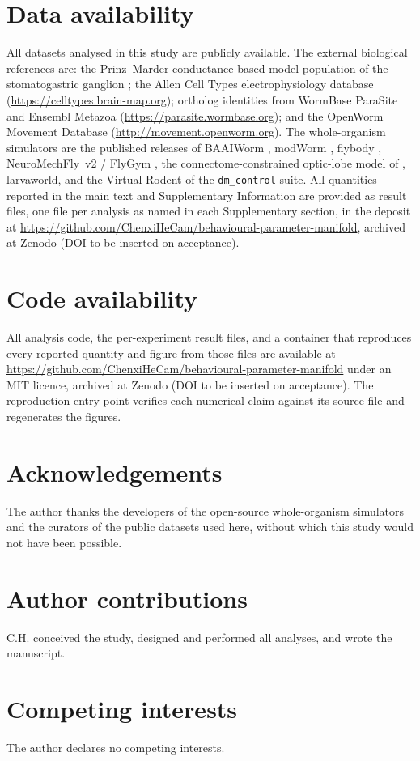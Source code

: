 \documentclass[11pt]{article}
\begin{document}
\section*{Data availability}
All datasets analysed in this study are publicly available. The external biological references are: the Prinz--Marder conductance-based model population of the stomatogastric ganglion \citep{prinz2004similar}; the Allen Cell Types electrophysiology database (\url{https://celltypes.brain-map.org}); ortholog identities from WormBase ParaSite and Ensembl Metazoa (\url{https://parasite.wormbase.org}); and the OpenWorm Movement Database (\url{http://movement.openworm.org}). The whole-organism simulators are the published releases of BAAIWorm \citep{wang2025baaiworm}, modWorm \citep{shlizerman2025modworm}, flybody \citep{vaxenburg2025flybody}, NeuroMechFly~v2 / FlyGym \citep{wangchen2024neuromechfly}, the connectome-constrained optic-lobe model of \citet{lappalainen2024connectome}, larvaworld, and the Virtual Rodent of the \texttt{dm\_control} suite. All quantities reported in the main text and Supplementary Information are provided as result files, one file per analysis as named in each Supplementary section, in the deposit at \url{https://github.com/ChenxiHeCam/behavioural-parameter-manifold}, archived at Zenodo (DOI to be inserted on acceptance).

\section*{Code availability}
All analysis code, the per-experiment result files, and a container that reproduces every reported quantity and figure from those files are available at \url{https://github.com/ChenxiHeCam/behavioural-parameter-manifold} under an MIT licence, archived at Zenodo (DOI to be inserted on acceptance). The reproduction entry point verifies each numerical claim against its source file and regenerates the figures.

\section*{Acknowledgements}
The author thanks the developers of the open-source whole-organism simulators and the curators of the public datasets used here, without which this study would not have been possible.

\section*{Author contributions}
C.H. conceived the study, designed and performed all analyses, and wrote the manuscript.

\section*{Competing interests}
The author declares no competing interests.



\end{document}
